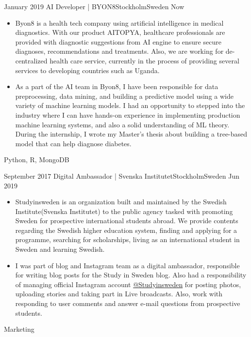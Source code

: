 %
%
%
\begin{experiences}
  \experience
    {January 2019} {AI Developer | BYON8}{Stockholm}{Sweden}
    {Now}    {\begin{itemize}
               \item Byon8 is a health tech company using artificial intelligence in medical diagnostics. With our product AITOPYA, healthcare professionals are provided with diagnostic suggestions from AI engine to ensure secure diagnoses, recommendations and treatments. Also, we are working for de-centralized health care service, currently in the process of providing several services to developing countries such as Uganda.
               \item As a part of the AI team in Byon8, I have been responsible for data preprocessing, data mining, and building a predictive model using a wide variety of machine learning models. I had an opportunity to stepped into the industry where I can have hands-on experience in implementing production machine learning systems, and also a solid understanding of ML theory. During the internship, I wrote my Master's thesis about building a tree-based model that can help diagnose diabetes.
               \end{itemize}}
            {Python, R, MongoDB}
  \emptySeparator
  
  
   \experience
    {September 2017} {Digital Ambassador | Svenska Institutet}{Stockholm}{Sweden}
    {Jun 2019}    {\begin{itemize}
               \item Studyinsweden is an organization built and maintained by the Swedish Institute(Svenska Institutet) to the public agency tasked with promoting Sweden for prospective international students abroad. We provide contents regarding the Swedish higher education system, finding and applying for a programme, searching for scholarships, living as an international student in Sweden and learning Swedish.
               \item I was part of blog and Instagram team as a digital ambassador, responsible for writing blog posts for the Study in Sweden blog. Also had a responsibility of managing official Instagram account \href{https://www.instagram.com/studyinsweden/}{@Studyinsweden} for posting photos, uploading stories and taking part in Live broadcasts. Also, work with responding to user comments and answer e-mail questions from prospective students.
               \end{itemize}}
            {Marketing}
  \emptySeparator
  
  
\end{experiences}
